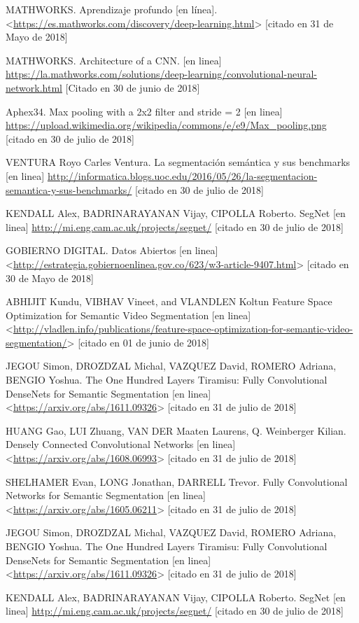 MATHWORKS. Aprendizaje profundo [en línea]. <\url{https://es.mathworks.com/discovery/deep-learning.html}> [citado en 31 de Mayo de 2018]

MATHWORKS. Architecture of a CNN. [en linea] \url{https://la.mathworks.com/solutions/deep-learning/convolutional-neural-network.html} [Citado en 30 de junio de 2018]

Aphex34. Max pooling with a 2x2 filter and stride = 2 [en linea] \url{https://upload.wikimedia.org/wikipedia/commons/e/e9/Max_pooling.png} [citado en 30 de julio de 2018]

VENTURA Royo Carles Ventura. La segmentación semántica y sus benchmarks [en linea] \url{http://informatica.blogs.uoc.edu/2016/05/26/la-segmentacion-semantica-y-sus-benchmarks/} [citado en 30 de julio de 2018]

KENDALL Alex, BADRINARAYANAN Vijay, CIPOLLA Roberto. SegNet [en linea] \url{http://mi.eng.cam.ac.uk/projects/segnet/} [citado en 30 de julio de 2018]

GOBIERNO DIGITAL. Datos Abiertos [en linea] <\url{http://estrategia.gobiernoenlinea.gov.co/623/w3-article-9407.html}> [citado en 30 de Mayo de 2018]

ABHIJIT Kundu, VIBHAV Vineet, and VLANDLEN Koltun Feature Space Optimization for Semantic Video Segmentation [en linea] <\url{http://vladlen.info/publications/feature-space-optimization-for-semantic-video-segmentation/}> [citado en 01 de junio de 2018]

JEGOU Simon, DROZDZAL Michal, VAZQUEZ David, ROMERO Adriana, BENGIO Yoshua. The One Hundred Layers Tiramisu: Fully Convolutional DenseNets for Semantic Segmentation [en linea] <\url{https://arxiv.org/abs/1611.09326}> [citado en 31 de julio de 2018]

HUANG Gao, LUI Zhuang, VAN DER Maaten Laurens, Q. Weinberger Kilian. Densely Connected Convolutional Networks [en linea] <\url{https://arxiv.org/abs/1608.06993}> [citado en 31 de julio de 2018]

SHELHAMER Evan, LONG Jonathan, DARRELL Trevor. Fully Convolutional Networks for Semantic Segmentation [en linea] <\url{https://arxiv.org/abs/1605.06211}> [citado en 31 de julio de 2018]

JEGOU Simon, DROZDZAL Michal, VAZQUEZ David, ROMERO Adriana, BENGIO Yoshua. The One Hundred Layers Tiramisu: Fully Convolutional DenseNets for Semantic Segmentation [en linea] <\url{https://arxiv.org/abs/1611.09326}> [citado en 31 de julio de 2018]

KENDALL Alex, BADRINARAYANAN Vijay, CIPOLLA Roberto. SegNet [en linea] \url{http://mi.eng.cam.ac.uk/projects/segnet/} [citado en 30 de julio de 2018]

